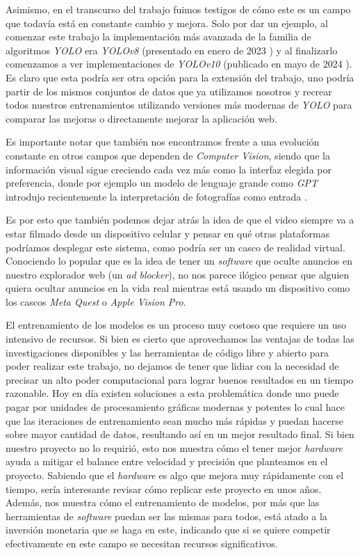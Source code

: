 \documentclass[a4paper]{article}
\begin{document}
Asimismo, en el transcurso del trabajo fuimos testigos de cómo este es un campo que todavía está en constante cambio y mejora. Solo por dar un ejemplo, al comenzar este trabajo la implementación más avanzada de la familia de algoritmos \textit{YOLO} era \textit{YOLOv8} (presentado en enero de 2023 \cite{yolov8}) y al finalizarlo comenzamos a ver implementaciones de \textit{YOLOv10} (publicado en mayo de 2024 \cite{yolov10}). Es claro que esta podría ser otra opción para la extensión del trabajo, uno podría partir de los mismos conjuntos de datos que ya utilizamos nosotros y recrear todos nuestros entrenamientos utilizando versiones más modernas de \textit{YOLO} para comparar las mejoras o directamente mejorar la aplicación web. \medskip

Es importante notar que también nos encontramos frente a una evolución constante en otros campos que dependen de \textit{Computer Vision}, siendo que la información visual sigue creciendo cada vez más como la interfaz elegida por preferencia, donde por ejemplo un modelo de lenguaje grande como \textit{GPT} introdujo recientemente la interpretación de fotografías como entrada \cite{chatgpt-vision}.

Es por esto que también podemos dejar atrás la idea de que el video siempre va a estar filmado desde un dispositivo celular y pensar en qué otras plataformas podríamos desplegar este sistema, como podría ser un casco de realidad virtual. Conociendo lo popular que es la idea de tener un \textit{software} que oculte anuncios en nuestro explorador web (un \textit{ad blocker}), no nos parece ilógico pensar que alguien quiera ocultar anuncios en la vida real mientras está usando un dispositivo como los cascos \textit{Meta Quest} o \textit{Apple Vision Pro}. \medskip

El entrenamiento de los modelos es un proceso muy costoso que requiere un uso intensivo de recursos. Si bien es cierto que aprovechamos las ventajas de todas las investigaciones disponibles y las herramientas de código libre y abierto para poder realizar este trabajo, no dejamos de tener que lidiar con la necesidad de precisar un alto poder computacional para lograr buenos resultados en un tiempo razonable. Hoy en día existen soluciones a esta problemática donde uno puede pagar por unidades de procesamiento gráficas modernas y potentes lo cual hace que las iteraciones de entrenamiento sean mucho más rápidas y puedan hacerse sobre mayor cantidad de datos, resultando así en un mejor resultado final. Si bien nuestro proyecto no lo requirió, esto nos muestra cómo el tener mejor \textit{hardware} ayuda a mitigar el balance entre velocidad y precisión que planteamos en el proyecto. Sabiendo que el \textit{hardware} es algo que mejora muy rápidamente con el tiempo, sería interesante revisar cómo replicar este proyecto en unos años. Además, nos muestra cómo el entrenamiento de modelos, por más que las herramientas de \textit{software} puedan ser las mismas para todos, está atado a la inversión monetaria que se haga en este, indicando que si se quiere competir efectivamente en este campo se necesitan recursos significativos. \medskip
\end{document}
